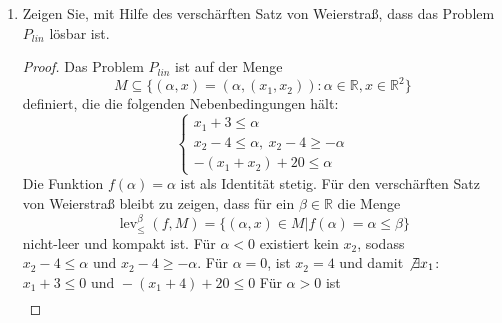 \documentclass[12pt]{extreport} %
\newcommand{\R}{\mathbb{R}}
\theoremstyle{named}
\theoremstyle{nnamed}
\theoremstyle{itshape}
\theoremstyle{normal}
\begin{document}
\begin{enumerate}
\begin{proof}
\begin{align*}
			\end{align*} 
			Die Bedingung $f(x) \leq \alpha$ aus der Epigraph-Formulierung bedeutet, dass jede Komponente des Maximums kleiner gleich $\alpha$ sein muss, d.h. das folgende Problem ist äquivalent zu $P_{epi}$:
			$$  \tilde{P}_{epi}: \min_{(x, \alpha) \in \R^2 \times \R} e^{\alpha} \text{ s.t. } x \in X, \begin{cases} x_1 + 3 \leq \alpha \\
			 x_2 - 4 \leq \alpha, ~ x_2 - 4 \geq - \alpha \\ -(x_1 + x_2) + 20 \leq \alpha \end{cases} $$
			 Da die Exponentialfunktion streng monoton ist, ist jedes Minimum der Identität auf dieser Menge gleich dem Minimum der Exponentialfunktion. Ein lineares Optimierungsproblem $P_{lin}$, welches die selben Optimalpunkte wie $P_{epi}$ besitzt, lautet somit
			$$  {P}_{lin}: \min_{(x, \alpha) \in \R^2 \times \R} \alpha \text{ s.t. } x \in X, \begin{cases} x_1 + 3 \leq \alpha \\
			 x_2 - 4 \leq \alpha, ~ x_2 - 4 \geq - \alpha \\ -(x_1 + x_2) + 20 \leq \alpha \end{cases} $$			 
		\end{proof}
	\item Zeigen Sie, mit Hilfe des verschärften Satz von Weierstraß, dass das Problem $P_{lin}$ lösbar ist.
		\begin{proof}
			Das Problem $P_{lin}$ ist auf der Menge $$M \subseteq \big\{ (\alpha, x) = (\alpha, (x_1, x_2)) : \alpha \in \R, x \in \R^2 \big\}$$ definiert, die die folgenden Nebenbedingungen hält:
			$$\begin{cases} x_1 + 3 \leq \alpha \\
			 x_2 - 4 \leq \alpha, ~ x_2 - 4 \geq - \alpha \\ -(x_1 + x_2) + 20 \leq \alpha \end{cases} $$	
			 Die Funktion $f(\alpha) = \alpha$ ist als Identität stetig. Für den verschärften Satz von Weierstraß bleibt zu zeigen, dass für ein $\beta \in \R$ die Menge
			  $$ \operatorname{lev}_{\leq}^{\beta}(f, M)= \big\{ (\alpha, x) \in M | f(\alpha) = \alpha \leq \beta \big\}  $$
			  nicht-leer und kompakt ist. Für $\alpha < 0$ existiert kein $x_2$, sodass $x_2 - 4 \leq \alpha \text{ und } x_2 -4 \geq - \alpha$. Für $\alpha = 0$, ist $x_2 = 4$ und damit $\not\exists x_1$: $x_1 + 3 \leq 0 \text{ und } - (x_1 + 4) + 20 \leq 0$ Für $\alpha > 0$ ist 
			 \begin{align}

\end{align}
\end{proof}
\end{enumerate}
\end{document}
